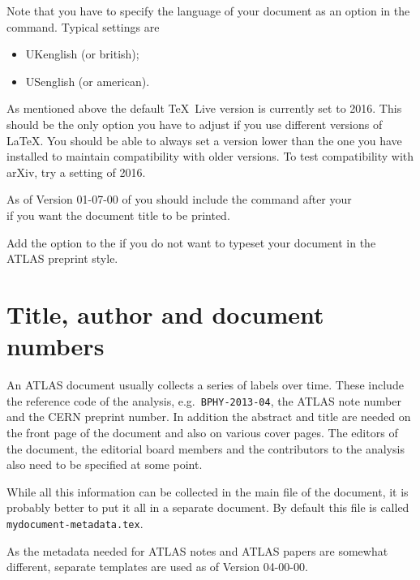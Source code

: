 Note that you have to specify the language of your document as an option in the
 command. Typical settings are
\begin{itemize}
\item UKenglish (or british);
\item USenglish (or american).
\end{itemize}

As mentioned above the default \TeX\ Live version is currently set to 2016.
This should be the only option you have to adjust if you use different versions of \LaTeX.
You should be able to always set a version lower than the one you have installed to maintain compatibility with older versions.
To test compatibility with arXiv, try a setting of 2016.

As of Version 01-07-00 of  you should include the command  after your\\
\verb|| if you want the document title to be printed.

Add the option  to the  if you do not want to typeset your document in the ATLAS preprint style.


\section{Title, author and document numbers}
\label{sec:metadata}

An ATLAS document usually collects a series of labels over time.
These include the reference code of the analysis, e.g.\ \texttt{BPHY-2013-04}, 
the ATLAS note number and the CERN preprint number.
In addition the abstract and title are needed on the front page of the document and also on various cover pages.
The editors of the document, the editorial board members and the contributors to the analysis
also need to be specified at some point.

While all this information can be collected in the main file of the document, 
it is probably better to put it all in a separate document.
By default this file is called \texttt{mydocument-metadata.tex}.

As the metadata needed for ATLAS notes and ATLAS papers are somewhat different,
separate templates are used as of Version 04-00-00.


